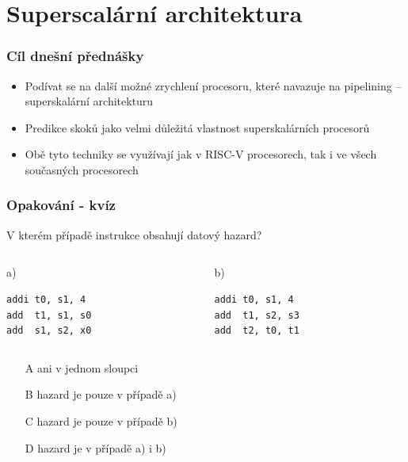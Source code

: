 \documentclass{beamer}
\subtitle{Lekce 06. Superskalární architektura\\a\\prediktory skoků}
\author{Pavel Píša \phantom{xxxxxxxxx} Petr Štěpán \\ \small\texttt{pisa@fel.cvut.cz}\phantom{xxxx}\small\texttt{stepan@fel.cvut.cz}}
\begin{document}
\maketitle

\section{Superscalární architektura}

\begin{frame}
\frametitle{Cíl dnešní přednášky}

\begin{itemize}
 \item Podívat se na další možné zrychlení procesoru, které navazuje na pipelining -- superskalární architekturu
 \item Predikce skoků jako velmi důležitá vlastnost superskalárních procesorů
 \item Obě tyto techniky se využívají jak v RISC-V procesorech, tak i ve všech současných procesorech
\end{itemize}

\end{frame}

\begin{frame}[fragile]
\frametitle{Opakování - kvíz}

V kterém případě instrukce obsahují datový hazard?

\begin{columns}[T]
\begin{column}{0.40\textwidth}
\phantom{xxxxx}a)

\begin{verbatim}
addi t0, s1, 4
add  t1, s1, s0
add  s1, s2, x0
\end{verbatim}
\end{column}
\begin{column}{0.40\textwidth}
\phantom{xxxxx}b)

\begin{verbatim}
addi t0, s1, 4
add  t1, s2, s3
add  t2, t0, t1
\end{verbatim}
\end{column}
\end{columns}
\bigskip
\begin{itemize}
 \item[A] ani v jednom sloupci
 \item[B] hazard je pouze v případě a)
 \item[C] hazard je pouze v případě b)
 \item[D] hazard je v případě a) i b)
\end{itemize}

\end{frame}
\end{document}
